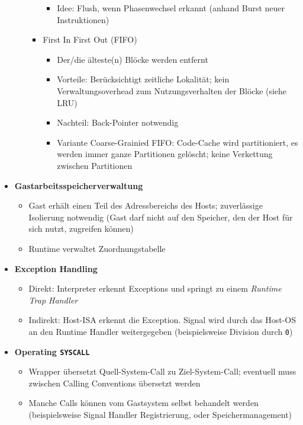 \begin{itemize}
\begin{itemize}
\begin{itemize}
\begin{itemize}
				\item Idee: Flush, wenn Phasenwechsel erkannt (anhand Burst neuer Instruktionen)
			\end{itemize}
			\item First In First Out (FIFO)
			\begin{itemize}
				\item Der/die älteste(n) Blöcke werden entfernt
				\item Vorteile: Berücksichtigt zeitliche Lokalität; kein Verwaltungsoverhead zum Nutzungsverhalten der Blöcke (siehe LRU)
				\item Nachteil: Back-Pointer notwendig
				\item Variante Coarse-Grainied FIFO: Code-Cache wird partitioniert, es werden immer ganze Partitionen gelöscht; keine Verkettung zwischen Partitionen
			\end{itemize}
		\end{itemize}
	\end{itemize}
	\item \textbf{Gastarbeitsspeicherverwaltung}
	\begin{itemize}
		\item Gast erhält einen Teil des Adressbereichs des Hosts; zuverlässige Isolierung notwendig (Gast darf nicht auf den Speicher, den der Host für sich nutzt, zugreifen können)
		\item Runtime verwaltet Zuordnungstabelle
	\end{itemize}
	\item \textbf{Exception Handling}
	\begin{itemize}
		\item Direkt: Interpreter erkennt Exceptions und springt zu einem \textit{Runtime Trap Handler}
		\item Indirekt: Host-ISA erkennt die Exception. Signal wird durch das Host-OS an den Runtime Handler weitergegeben (beispielsweise Division durch \texttt{0})
	\end{itemize}
	\item \textbf{Operating \texttt{SYSCALL}}
	\begin{itemize}
		\item Wrapper übersetzt Quell-System-Call zu Ziel-System-Call; eventuell muss zwischen Calling Conventions übersetzt werden
		\item Manche Calls können vom Gastsystem selbst behandelt werden (beispielsweise Signal Handler Registrierung, oder Speichermanagement)
	\end{itemize}
\end{itemize}



